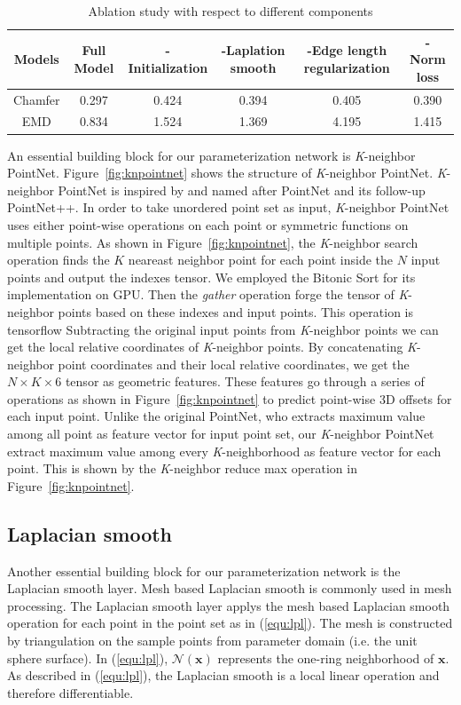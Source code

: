 \begin{table}
	\caption{Ablation study with respect to different components}
	\label{tab:ablation}
	\centering
	\begin{tabular}{c | c c c c c}
		Models &  Full Model  & -Initialization & -Laplation smooth & -Edge length regularization & -Norm loss \\
		\hline
		Chamfer      & 0.297 & 0.424 & 0.394 & 0.405  & 0.390\\
		EMD			 & 0.834 & 1.524 & 1.369 & 4.195  & 1.415
	\end{tabular}
\end{table}

An essential building block for our parameterization network is \textit{K}-neighbor PointNet. Figure~\ref{fig:knpointnet} shows the structure of \textit{K}-neighbor PointNet. \textit{K}-neighbor PointNet is inspired by and named after PointNet\cite{PointNet} and its follow-up PointNet++\cite{NIPS2017_7095}. In order to take unordered point set as input, \textit{K}-neighbor PointNet uses either point-wise operations on each point or symmetric functions on multiple points. As shown in Figure~\ref{fig:knpointnet}, the \textit{K}-neighbor search operation finds the $K$ neareast neighbor point for each point inside the $N$ input points and output the indexes tensor. We employed the Bitonic Sort\cite{bitonicsorter} for its implementation on GPU. Then the  \emph{gather} operation forge the tensor of \textit{K}-neighbor points based on these indexes and input points. This operation is tensorflow  Subtracting the original input points from \textit{K}-neighbor points we can get the local relative coordinates of \textit{K}-neighbor points. By concatenating \textit{K}-neighbor point coordinates and their local relative coordinates, we get the $N\times K\times6$ tensor as geometric features. These features go through a series of operations as shown in Figure~\ref{fig:knpointnet} to predict point-wise 3D offsets for each input point. Unlike the original PointNet\cite{PointNet}, who extracts maximum value among all point as feature vector for input point set, our \textit{K}-neighbor PointNet extract maximum value among every \textit{K}-neighborhood as feature vector for each point. This is shown by the \textit{K}-neighbor reduce max operation in Figure~\ref{fig:knpointnet}.

\subsection{Laplacian smooth}
Another essential building block for our parameterization network is the Laplacian smooth layer. Mesh based Laplacian smooth is commonly used in mesh processing. The Laplacian smooth layer applys the mesh based Laplacian smooth operation for each point in the point set as in (\ref{equ:lpl}). The mesh is constructed by triangulation on the sample points from parameter domain (i.e. the unit sphere surface). In (\ref{equ:lpl}), $\mathcal{N}(\mathbf{x})$ represents the one-ring neighborhood of $\mathbf{x}$. As described in (\ref{equ:lpl}), the Laplacian smooth is a local linear operation and therefore differentiable.

